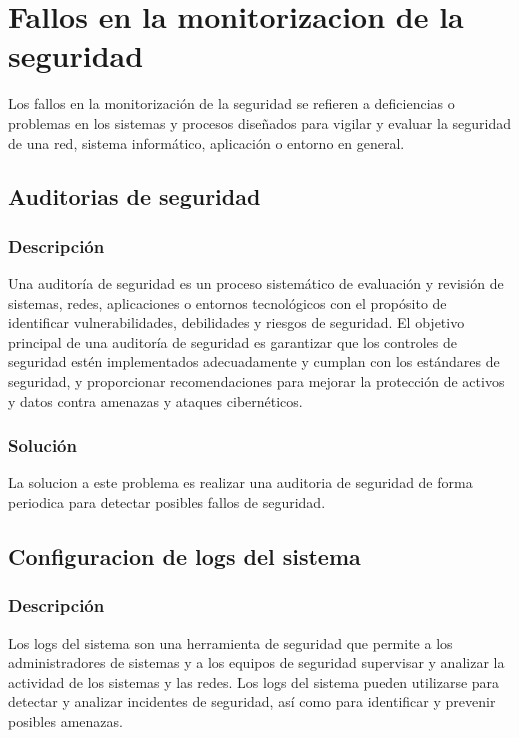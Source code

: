 \documentclass{report}
\begin{document}
        \section{Fallos en la monitorizacion de la seguridad}
            Los fallos en la monitorización de la seguridad se refieren a deficiencias o problemas en los sistemas y procesos diseñados para vigilar y evaluar la seguridad de una red, sistema informático, aplicación o entorno en general.
            \subsection{Auditorias de seguridad}
                \subsubsection{Descripción}
                    Una auditoría de seguridad es un proceso sistemático de evaluación y revisión de sistemas, redes, aplicaciones o entornos tecnológicos con el propósito de identificar vulnerabilidades, debilidades y riesgos de seguridad. El objetivo principal de una auditoría de seguridad es garantizar que los controles de seguridad estén implementados adecuadamente y cumplan con los estándares de seguridad, y proporcionar recomendaciones para mejorar la protección de activos y datos contra amenazas y ataques cibernéticos.
                \subsubsection{Solución}
                    La solucion a este problema es realizar una auditoria de seguridad de forma periodica para detectar posibles fallos de seguridad. 
            \clearpage
            \subsection{Configuracion de logs del sistema}
                \subsubsection{Descripción}
                    Los logs del sistema son una herramienta de seguridad que permite a los administradores de sistemas y a los equipos de seguridad supervisar y analizar la actividad de los sistemas y las redes. Los logs del sistema pueden utilizarse para detectar y analizar incidentes de seguridad, así como para identificar y prevenir posibles amenazas.
\end{document}
